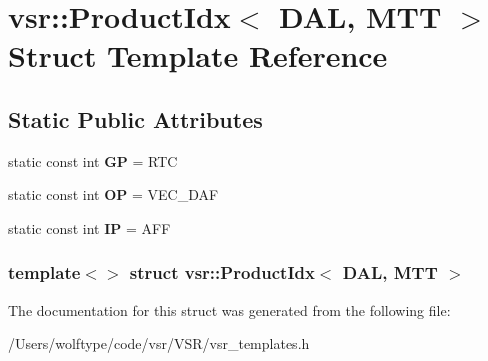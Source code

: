 \hypertarget{structvsr_1_1_product_idx_3_01_d_a_l_00_01_m_t_t_01_4}{\section{vsr\-:\-:Product\-Idx$<$ D\-A\-L, M\-T\-T $>$ Struct Template Reference}
\label{structvsr_1_1_product_idx_3_01_d_a_l_00_01_m_t_t_01_4}
}
\subsection*{Static Public Attributes}
\begin{DoxyCompactItemize}
\item 
\hypertarget{structvsr_1_1_product_idx_3_01_d_a_l_00_01_m_t_t_01_4_a24a5d8bcf8bf072076e7bb6cbe6783ab}{static const int {\bfseries G\-P} = R\-T\-C}\label{structvsr_1_1_product_idx_3_01_d_a_l_00_01_m_t_t_01_4_a24a5d8bcf8bf072076e7bb6cbe6783ab}

\item 
\hypertarget{structvsr_1_1_product_idx_3_01_d_a_l_00_01_m_t_t_01_4_a72021e7a9038e7ba289348a740a212b6}{static const int {\bfseries O\-P} = V\-E\-C\-\_\-\-D\-A\-F}\label{structvsr_1_1_product_idx_3_01_d_a_l_00_01_m_t_t_01_4_a72021e7a9038e7ba289348a740a212b6}

\item 
\hypertarget{structvsr_1_1_product_idx_3_01_d_a_l_00_01_m_t_t_01_4_a5a6a300bac0b8370a6ba3ebcf15ca6e8}{static const int {\bfseries I\-P} = A\-F\-F}\label{structvsr_1_1_product_idx_3_01_d_a_l_00_01_m_t_t_01_4_a5a6a300bac0b8370a6ba3ebcf15ca6e8}

\end{DoxyCompactItemize}
\subsubsection*{template$<$$>$ struct vsr\-::\-Product\-Idx$<$ D\-A\-L, M\-T\-T $>$}



The documentation for this struct was generated from the following file\-:\begin{DoxyCompactItemize}
\item 
/\-Users/wolftype/code/vsr/\-V\-S\-R/vsr\-\_\-templates.\-h\end{DoxyCompactItemize}
